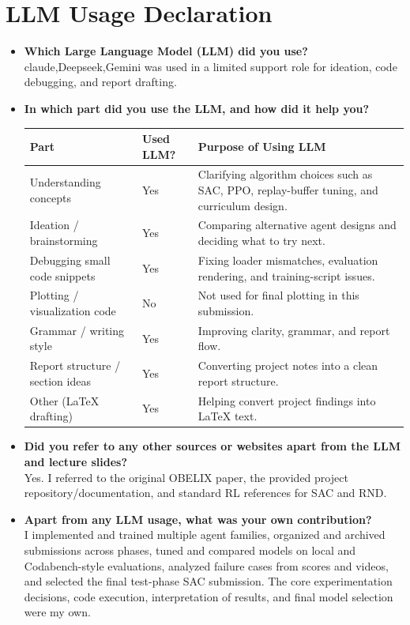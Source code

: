 \documentclass[11pt,oneside]{article}
\begin{document}
\section*{LLM Usage Declaration}
\begin{itemize}[leftmargin=*]
\item \textbf{Which Large Language Model (LLM) did you use?}\\
claude,Deepseek,Gemini was used in a limited support role for ideation, code debugging, and report drafting.

\item \textbf{In which part did you use the LLM, and how did it help you?}

\begin{center}
\begin{tabular}{l|l|p{7.4cm}}
\toprule
Part & Used LLM? & Purpose of Using LLM \\
\midrule
Understanding concepts & Yes & Clarifying algorithm choices such as SAC, PPO, replay-buffer tuning, and curriculum design. \\
Ideation / brainstorming & Yes & Comparing alternative agent designs and deciding what to try next. \\
Debugging small code snippets & Yes & Fixing loader mismatches, evaluation rendering, and training-script issues. \\
Plotting / visualization code & No & Not used for final plotting in this submission. \\
Grammar / writing style & Yes & Improving clarity, grammar, and report flow. \\
Report structure / section ideas & Yes & Converting project notes into a clean report structure. \\
Other (LaTeX drafting) & Yes & Helping convert project findings into LaTeX text. \\
\bottomrule
\end{tabular}
\end{center}

\item \textbf{Did you refer to any other sources or websites apart from the LLM and lecture slides?}\\
Yes. I referred to the original OBELIX paper, the provided project repository/documentation, and standard RL references for SAC and RND.

\item \textbf{Apart from any LLM usage, what was your own contribution?}\\
I implemented and trained multiple agent families, organized and archived submissions across phases, tuned and compared models on local and Codabench-style evaluations, analyzed failure cases from scores and videos, and selected the final test-phase SAC submission. The core experimentation decisions, code execution, interpretation of results, and final model selection were my own.
\end{itemize}



\end{document}
